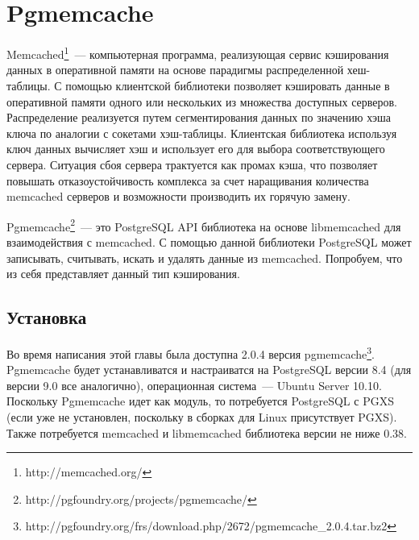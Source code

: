 \section{Pgmemcache}
\label{sec:pgmemcache}
Memcached\footnote{http://memcached.org/}~--- 
компьютерная программа, реализующая сервис кэширования данных в оперативной памяти на основе 
парадигмы распределенной хеш-таблицы. С помощью клиентской библиотеки позволяет кэшировать данные в оперативной 
памяти одного или нескольких из множества доступных серверов. Распределение реализуется путем сегментирования 
данных по значению хэша ключа по аналогии с сокетами хэш-таблицы. Клиентская библиотека используя ключ данных 
вычисляет хэш и использует его для выбора соответствующего сервера. Ситуация сбоя сервера трактуется как промах 
кэша, что позволяет повышать отказоустойчивость комплекса за счет наращивания количества memcached серверов и возможности 
производить их горячую замену.

Pgmemcache\footnote{http://pgfoundry.org/projects/pgmemcache/}~--- это 
PostgreSQL API библиотека на основе libmemcached для взаимодействия с memcached. С помощью данной библиотеки 
PostgreSQL может записывать, считывать, искать и удалять данные из memcached. Попробуем, что из себя представляет данный тип кэширования.


\subsection{Установка}
Во время написания этой главы была доступна 2.0.4 версия 
pgmemcache\footnote{http://pgfoundry.org/frs/download.php/2672/pgmemcache\_2.0.4.tar.bz2}. 
Pgmemcache будет устанавливатся и настраиватся на PostgreSQL версии 8.4 (для версии 9.0 все аналогично), 
операционная система~--- Ubuntu Server 10.10. Поскольку Pgmemcache идет как модуль, 
то потребуется PostgreSQL с PGXS (если уже не установлен, поскольку в сборках для Linux присутствует PGXS). 
Также потребуется memcached и libmemcached библиотека версии не ниже 0.38. 

